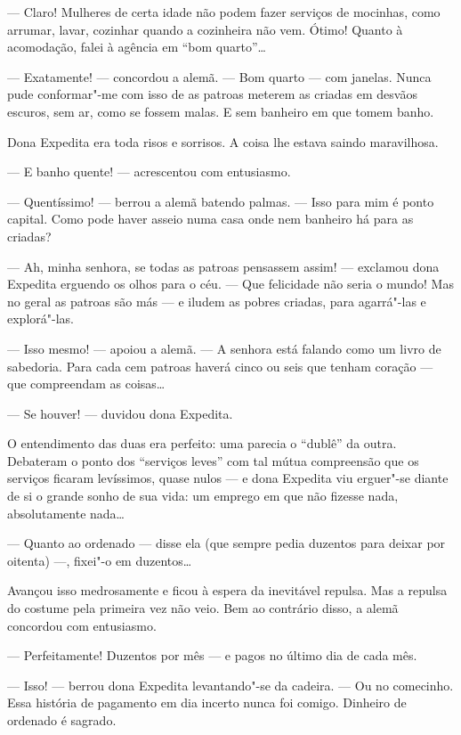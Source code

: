 --- Claro! Mulheres de certa idade não podem fazer serviços de mocinhas,
como arrumar, lavar, cozinhar quando a cozinheira não vem. Ótimo! Quanto
à acomodação, falei à agência em ``bom quarto''\ldots{}

--- Exatamente! --- concordou a alemã. --- Bom quarto --- com janelas.
Nunca pude conformar"-me com isso de as patroas meterem as criadas em
desvãos escuros, sem ar, como se fossem malas. E sem banheiro em que
tomem banho.

Dona Expedita era toda risos e sorrisos. A coisa lhe estava saindo
maravilhosa.

--- E banho quente! --- acrescentou com entusiasmo.

--- Quentíssimo! --- berrou a alemã batendo palmas. --- Isso para mim é
ponto capital. Como pode haver asseio numa casa onde nem banheiro há
para as criadas?

--- Ah, minha senhora, se todas as patroas pensassem assim! --- exclamou
dona Expedita erguendo os olhos para o céu. --- Que felicidade não seria
o mundo! Mas no geral as patroas são más --- e iludem as pobres criadas,
para agarrá"-las e explorá"-las.

--- Isso mesmo! --- apoiou a alemã. --- A senhora está falando como um
livro de sabedoria. Para cada cem patroas haverá cinco ou seis que
tenham coração --- que compreendam as coisas\ldots{}

--- Se houver! --- duvidou dona Expedita.

O entendimento das duas era perfeito: uma parecia o ``dublê'' da outra.
Debateram o ponto dos ``serviços leves'' com tal mútua compreensão que
os serviços ficaram levíssimos, quase nulos --- e dona Expedita viu
erguer"-se diante de si o grande sonho de sua vida: um emprego em que não
fizesse nada, absolutamente nada\ldots{}

--- Quanto ao ordenado --- disse ela (que sempre pedia duzentos para
deixar por oitenta) ---, fixei"-o em duzentos\ldots{}

Avançou isso medrosamente e ficou à espera da inevitável repulsa. Mas a
repulsa do costume pela primeira vez não veio. Bem ao contrário disso, a
alemã concordou com entusiasmo.

--- Perfeitamente! Duzentos por mês --- e pagos no último dia de cada
mês.

--- Isso! --- berrou dona Expedita levantando"-se da cadeira. --- Ou no
comecinho. Essa história de pagamento em dia incerto nunca foi comigo.
Dinheiro de ordenado é sagrado.

